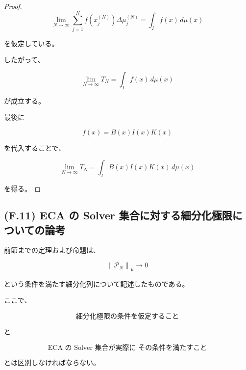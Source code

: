 \documentclass[a4paper,11pt]{article}
\begin{document}
\begin{proof}
\begin{equation}
    \lim_{N\to\infty}
    \sum_{j=1}^{N}
    f\!\left(x_j^{(N)}\right)
    \Delta\mu_j^{(N)}
    =
    \int_I f(x)\,d\mu(x)
\end{equation}

を仮定している。

したがって、

\begin{equation}
    \lim_{N\to\infty}T_N
    =
    \int_I f(x)\,d\mu(x)
\end{equation}

が成立する。

最後に

\begin{equation}
    f(x)=B(x)I(x)K(x)
\end{equation}

を代入することで、

\begin{equation}
    \boxed{
        \lim_{N\to\infty}T_N
        =
        \int_I
        B(x)I(x)K(x)\,d\mu(x)
    }
\end{equation}

を得る。
\end{proof}


\subsection{(F.11) ECA の Solver 集合に対する細分化極限についての論考}
\label{subsec:F11}

前節までの定理および命題は、

\begin{equation}
    \left\|
    \mathcal{P}_N
    \right\|_\mu
    \longrightarrow0
\end{equation}

という条件を満たす細分化列について記述したものである。

ここで、

\begin{equation}
    \boxed{
        \text{細分化極限の条件を仮定すること}
    }
\end{equation}

と

\begin{equation}
    \boxed{
        \text{ECA の Solver 集合が実際に
        その条件を満たすこと}
    }
\end{equation}

とは区別しなければならない。
\end{document}
